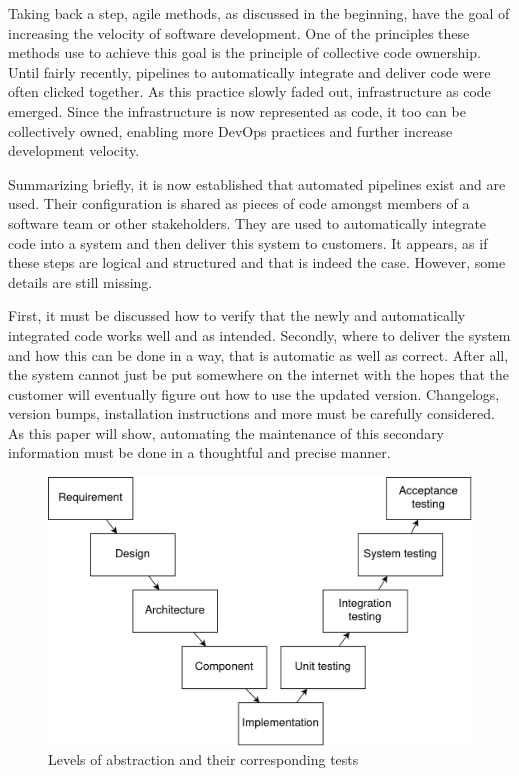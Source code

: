 Taking back a step, agile methods, as discussed in the beginning, have the goal of increasing the velocity of software development\cite{ADecadeOfAgileMethodologies}.
One of the principles these methods use to achieve this goal is the principle of collective code ownership\cite{CommonAgilePracticesInSoftwareProcesses, ManagingCodeOwnership}.
Until fairly recently, pipelines to automatically integrate and deliver code were often clicked together\cite{JenkinsClassicUi}.
As this practice slowly faded out, infrastructure as code emerged\cite{ASystematicMappingStudyOfInfrastructureAsCodeResearch}.
Since the infrastructure is now represented as code, it too can be collectively owned, enabling more DevOps practices and further increase development velocity.

Summarizing briefly, it is now established that automated pipelines exist and are used.
Their configuration is shared as pieces of code amongst members of a software team or other stakeholders.
They are used to automatically integrate code into a system and then deliver this system to customers.
It appears, as if these steps are logical and structured and that is indeed the case.
However, some details are still missing.

First, it must be discussed how to verify that the newly and automatically integrated code works well and as intended.
Secondly, where to deliver the system and how this can be done in a way, that is automatic as well as correct.
After all, the system cannot just be put somewhere on the internet with the hopes that the customer will eventually figure out how to use the updated version.
Changelogs, version bumps, installation instructions and more must be carefully considered.
As this paper will show,  automating the maintenance of this secondary information must be done in a thoughtful and precise manner.

\begin{figure}[H]
\centering
\includegraphics[width=0.5\textheight]{img/introduction/software-testing-v.drawio}
\caption{Levels of abstraction and their corresponding tests}
\label{fig:levels-of-abstraction-and-tests}
\end{figure}

